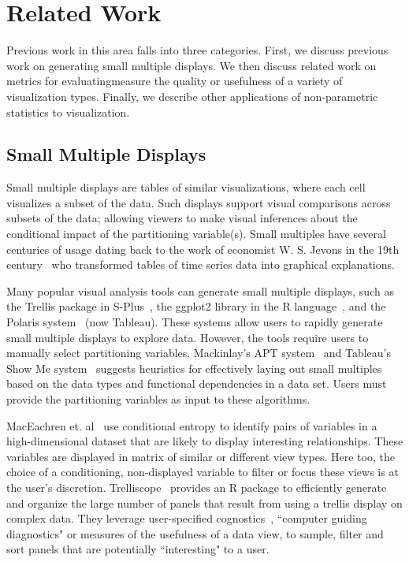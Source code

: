 \section{Related Work}
\label{sec:related}
Previous work in this area falls into three categories. First, we discuss previous work on generating small multiple displays. We then discuss related work on metrics for evaluatingmeasure the quality or usefulness of a variety of visualization types. Finally, we describe other applications of non-parametric statistics to visualization.

\subsection{Small Multiple Displays}
Small multiple displays are tables of similar visualizations, where each cell visualizes a subset of the data. Such displays support visual comparisons across subsets of the data; allowing viewers to make visual inferences about the conditional impact of the partitioning variable(s). Small multiples have several centuries of usage dating back to the work of economist W. S. Jevons in the 19th century~\cite{Kelley1973} who transformed tables of time series data into graphical explanations. 

Many popular visual analysis tools can generate small multiple displays, such as the Trellis package in S-Plus~\cite{Becker1996-manual}, the ggplot2 library in the R language~\cite{Wickham2006}, and the Polaris system~\cite{Stolte2002} (now Tableau). These systems allow users to rapidly generate small multiple displays to explore data. However, the tools require users to manually select partitioning variables. Mackinlay's APT system~\cite{mackinlay1986} and Tableau's Show Me system~\cite{mackinlay2007} suggests heuristics for effectively laying out small multiples based on the data types and functional dependencies in a data set. Users must provide the partitioning variables as input to these algorithms. 

MacEachren et. al~\cite{Maceachren2003} use conditional entropy to identify pairs of variables in a high-dimensional dataset that are likely to display interesting relationships. These variables are displayed in matrix of similar or different view types. Here too, the choice of a conditioning, non-displayed variable to filter or focus these views is at the user's discretion. Trelliscope~\cite{Hafen2013} provides an R package to efficiently generate and organize the large number of panels that result from using a trellis display on complex data. They leverage user-specified cognostics~\cite{Tukey1982}, ``computer guiding diagnostics" or measures of the usefulness of a data view, to sample, filter and sort panels that are potentially ``interesting" to a user. 


